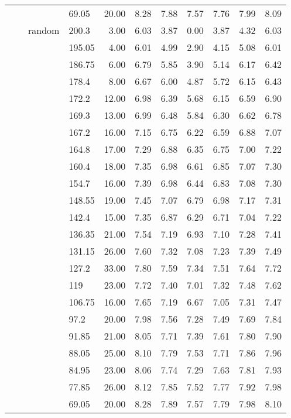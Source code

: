 \begin{longtable}{llllrrrrrrr}
   &  &  & 69.05 & 20.00 & 8.28 & 7.88 & 7.57 & 7.76 & 7.99 & 8.09 \\ 
   &  & random & 200.3 & 3.00 & 6.03 & 3.87 & 0.00 & 3.87 & 4.32 & 6.03 \\ 
   &  &  & 195.05 & 4.00 & 6.01 & 4.99 & 2.90 & 4.15 & 5.08 & 6.01 \\ 
   &  &  & 186.75 & 6.00 & 6.79 & 5.85 & 3.90 & 5.14 & 6.17 & 6.42 \\ 
   &  &  & 178.4 & 8.00 & 6.67 & 6.00 & 4.87 & 5.72 & 6.15 & 6.43 \\ 
   &  &  & 172.2 & 12.00 & 6.98 & 6.39 & 5.68 & 6.15 & 6.59 & 6.90 \\ 
   &  &  & 169.3 & 13.00 & 6.99 & 6.48 & 5.84 & 6.30 & 6.62 & 6.78 \\ 
   &  &  & 167.2 & 16.00 & 7.15 & 6.75 & 6.22 & 6.59 & 6.88 & 7.07 \\ 
   &  &  & 164.8 & 17.00 & 7.29 & 6.88 & 6.35 & 6.75 & 7.00 & 7.22 \\ 
   &  &  & 160.4 & 18.00 & 7.35 & 6.98 & 6.61 & 6.85 & 7.07 & 7.30 \\ 
   &  &  & 154.7 & 16.00 & 7.39 & 6.98 & 6.44 & 6.83 & 7.08 & 7.30 \\ 
   &  &  & 148.55 & 19.00 & 7.45 & 7.07 & 6.79 & 6.98 & 7.17 & 7.31 \\ 
   &  &  & 142.4 & 15.00 & 7.35 & 6.87 & 6.29 & 6.71 & 7.04 & 7.22 \\ 
   &  &  & 136.35 & 21.00 & 7.54 & 7.19 & 6.93 & 7.10 & 7.28 & 7.41 \\ 
   &  &  & 131.15 & 26.00 & 7.60 & 7.32 & 7.08 & 7.23 & 7.39 & 7.49 \\ 
   &  &  & 127.2 & 33.00 & 7.80 & 7.59 & 7.34 & 7.51 & 7.64 & 7.72 \\ 
   &  &  & 119 & 23.00 & 7.72 & 7.40 & 7.01 & 7.32 & 7.48 & 7.62 \\ 
   &  &  & 106.75 & 16.00 & 7.65 & 7.19 & 6.67 & 7.05 & 7.31 & 7.47 \\ 
   &  &  & 97.2 & 20.00 & 7.98 & 7.56 & 7.28 & 7.49 & 7.69 & 7.84 \\ 
   &  &  & 91.85 & 21.00 & 8.05 & 7.71 & 7.39 & 7.61 & 7.80 & 7.90 \\ 
   &  &  & 88.05 & 25.00 & 8.10 & 7.79 & 7.53 & 7.71 & 7.86 & 7.96 \\ 
   &  &  & 84.95 & 23.00 & 8.06 & 7.74 & 7.29 & 7.63 & 7.81 & 7.93 \\ 
   &  &  & 77.85 & 26.00 & 8.12 & 7.85 & 7.52 & 7.77 & 7.92 & 7.98 \\ 
   &  &  & 69.05 & 20.00 & 8.28 & 7.89 & 7.57 & 7.79 & 7.98 & 8.10 \\ 

\end{longtable}
